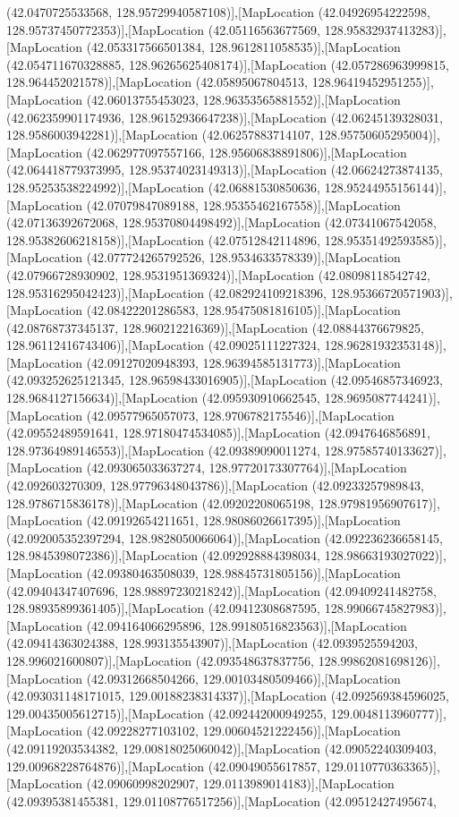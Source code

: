 (42.0470725533568, 128.95729940587108)],[MapLocation (42.04926954222598, 128.95737450772353)],[MapLocation (42.05116563677569, 128.95832937413283)],[MapLocation (42.053317566501384, 128.9612811058535)],[MapLocation (42.054711670328885, 128.96265625408174)],[MapLocation (42.057286963999815, 128.964452021578)],[MapLocation (42.05895067804513, 128.96419452951255)],[MapLocation (42.06013755453023, 128.96353565881552)],[MapLocation (42.062359901174936, 128.96152936647238)],[MapLocation (42.06245139328031, 128.9586003942281)],[MapLocation (42.06257883714107, 128.95750605295004)],[MapLocation (42.062977097557166, 128.95606838891806)],[MapLocation (42.064418779373995, 128.95374023149313)],[MapLocation (42.06624273874135, 128.95253538224992)],[MapLocation (42.06881530850636, 128.95244955156144)],[MapLocation (42.07079847089188, 128.95355462167558)],[MapLocation (42.07136392672068, 128.95370804498492)],[MapLocation (42.07341067542058, 128.95382606218158)],[MapLocation (42.07512842114896, 128.95351492593585)],[MapLocation (42.077724265792526, 128.9534633578339)],[MapLocation (42.07966728930902, 128.9531951369324)],[MapLocation (42.08098118542742, 128.95316295042423)],[MapLocation (42.082924109218396, 128.95366720571903)],[MapLocation (42.08422201286583, 128.95475081816105)],[MapLocation (42.08768737345137, 128.960212216369)],[MapLocation (42.08844376679825, 128.96112416743406)],[MapLocation (42.09025111227324, 128.96281932353148)],[MapLocation (42.09127020948393, 128.96394585131773)],[MapLocation (42.093252625121345, 128.96598433016905)],[MapLocation (42.09546857346923, 128.9684127156634)],[MapLocation (42.095930910662545, 128.9695087744241)],[MapLocation (42.09577965057073, 128.9706782175546)],[MapLocation (42.09552489591641, 128.97180474534085)],[MapLocation (42.0947646856891, 128.97364989146553)],[MapLocation (42.09389090011274, 128.97585740133627)],[MapLocation (42.093065033637274, 128.97720173307764)],[MapLocation (42.092603270309, 128.97796348043786)],[MapLocation (42.09233257989843, 128.9786715836178)],[MapLocation (42.09202208065198, 128.97981956907617)],[MapLocation (42.09192654211651, 128.98086026617395)],[MapLocation (42.092005352397294, 128.9828050066064)],[MapLocation (42.092236236658145, 128.9845398072386)],[MapLocation (42.092928884398034, 128.98663193027022)],[MapLocation (42.09380463508039, 128.98845731805156)],[MapLocation (42.09404347407696, 128.98897230218242)],[MapLocation (42.09409241482758, 128.98935899361405)],[MapLocation (42.09412308687595, 128.99066745827983)],[MapLocation (42.094164066295896, 128.99180516823563)],[MapLocation (42.09414363024388, 128.993135543907)],[MapLocation (42.0939525594203, 128.996021600807)],[MapLocation (42.093548637837756, 128.99862081698126)],[MapLocation (42.09312668504266, 129.00103480509466)],[MapLocation (42.093031148171015, 129.00188238314337)],[MapLocation (42.092569384596025, 129.00435005612715)],[MapLocation (42.092442000949255, 129.0048113960777)],[MapLocation (42.09228277103102, 129.00604521222456)],[MapLocation (42.09119203534382, 129.00818025060042)],[MapLocation (42.09052240309403, 129.00968228764876)],[MapLocation (42.09049055617857, 129.0110770363365)],[MapLocation (42.09060998202907, 129.0113989014183)],[MapLocation (42.09395381455381, 129.01108776517256)],[MapLocation (42.09512427495674, 